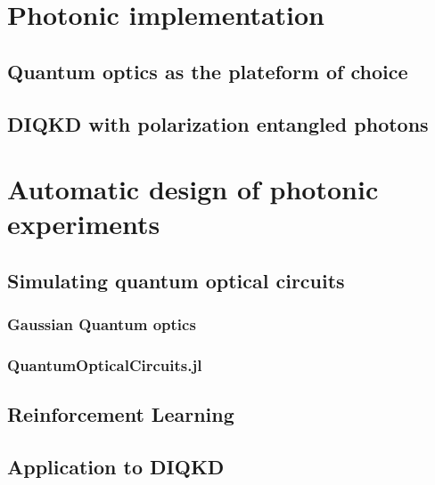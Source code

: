 \chapter{Photonic implementation}

\section{Quantum optics as the plateform of choice}

\section{DIQKD with polarization entangled photons}

\chapter{Automatic design of photonic experiments}

\section{Simulating quantum optical circuits}

\subsection{Gaussian Quantum optics}
\subsection{QuantumOpticalCircuits.jl}

\section{Reinforcement Learning}

\section{Application to DIQKD}
